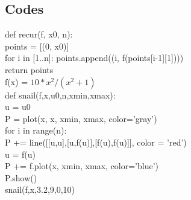 \documentclass[12pt]{article}
\begin{document}
\subsection{Codes}
def recur(f, x0, n):\\ 
    points = [(0, x0)] \\
    for i in [1..n]:
        points.append((i, f(points[i-1][1])))\\ 
    return points\\
f(x) = $10*x^2/(x^2+1)$\\
def snail(f,x,u0,n,xmin,xmax): \\
    u = u0\\
    P = plot(x, x, xmin, xmax, color='gray')\\ 
    for i in range(n):\\
        P += line([[u,u],[u,f(u)],[f(u),f(u)]], color = 'red')\\ 
        u = f(u)\\
        P += f.plot(x, xmin, xmax, color='blue')\\
    P.show() \\
snail(f,x,3.2,9,0,10)\\
 
                           
\end{document}
